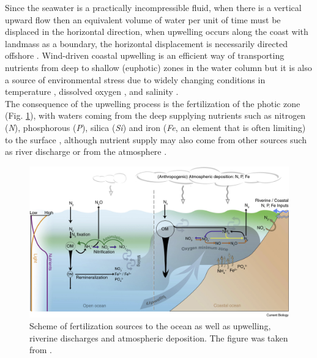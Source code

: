 Since the seawater is a practically incompressible fluid, when there is a vertical upward flow then an equivalent volume of water per unit of time must be displaced in the horizontal direction, when upwelling occurs along the coast with landmass as a boundary, the horizontal displacement is necessarily directed offshore \citep{KampCap2}. Wind-driven coastal upwelling is an efficient way of transporting nutrients from deep to shallow (euphotic) zones in the water column \citep{MessChav2015,MessChav2017} but it is also a source of environmental stress due to widely changing conditions in temperature \citep{CastWang2014}, dissolved oxygen \citep{Scul2010}, and salinity \citep{XuanHuan2012}.\\

The consequence of the upwelling process is the fertilization of the photic zone (Fig. \ref{Chap1UpwellingFertilization}), with waters coming from the deep supplying nutrients such as nitrogen (\textit{N}), phosphorous (\textit{P}), silica (\textit{Si}) and iron (\textit{Fe}, an element that is often limiting) to the surface \citep{GeidLaro1994,Behr1996,BehrKolb1999,Hutc2002,MoorMils2013,BrisMohr2017}, although nutrient supply may also come from other sources such as river discharge \citep{Shar2017} or from the atmosphere \citep{Powe2015}.\\

\begin{figure}[ht]
	\includegraphics[width=1.0\textwidth]{figures/Chap1UpwellingFertilization.jpg}
	\centering
	\caption{Scheme of fertilization sources to the ocean as well as upwelling, riverine discharges and atmospheric deposition. The figure was taken from \cite{BrisMohr2017}.}
	\centering
	\label{Chap1UpwellingFertilization}
\end{figure}

